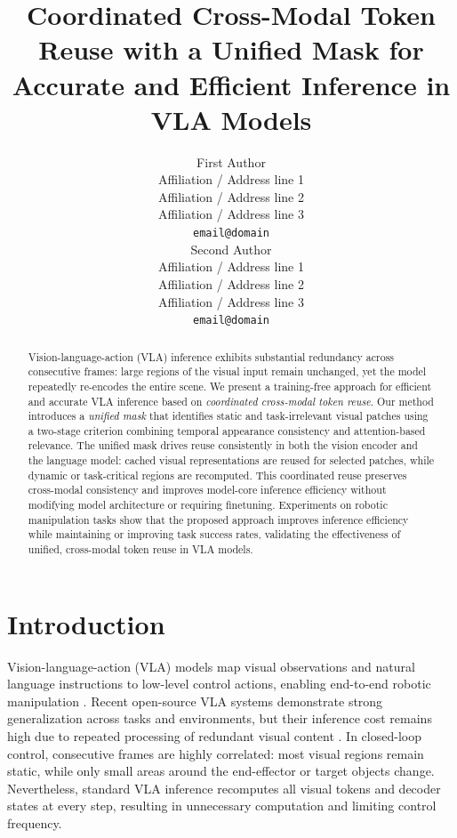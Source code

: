 \documentclass[11pt]{article}
\title{Coordinated Cross-Modal Token Reuse with a Unified Mask for Accurate and Efficient Inference in VLA Models}
\author{First Author \\
  Affiliation / Address line 1 \\
  Affiliation / Address line 2 \\
  Affiliation / Address line 3 \\
  \texttt{email@domain} \\ \And
  Second Author \\
  Affiliation / Address line 1 \\
  Affiliation / Address line 2 \\
  Affiliation / Address line 3 \\
  \texttt{email@domain} \\}
\begin{document}
\maketitle

\begin{abstract}
Vision-language-action (VLA) inference exhibits substantial redundancy across consecutive frames: large regions of the visual input remain unchanged, yet the model repeatedly re-encodes the entire scene. We present a training-free approach for efficient and accurate VLA inference based on \emph{coordinated cross-modal token reuse}. Our method introduces a \emph{unified mask} that identifies static and task-irrelevant visual patches using a two-stage criterion combining temporal appearance consistency and attention-based relevance. The unified mask drives reuse consistently in both the vision encoder and the language model: cached visual representations are reused for selected patches, while dynamic or task-critical regions are recomputed. This coordinated reuse preserves cross-modal consistency and improves model-core inference efficiency without modifying model architecture or requiring finetuning. Experiments on robotic manipulation tasks show that the proposed approach improves inference efficiency while maintaining or improving task success rates, validating the effectiveness of unified, cross-modal token reuse in VLA models.
\end{abstract}

\section{Introduction}
Vision-language-action (VLA) models map visual observations and natural language instructions to low-level control actions, enabling end-to-end robotic manipulation \citep{zitkovich2023rt,octo_2023,kim24openvla,black2024pi_0}. Recent open-source VLA systems demonstrate strong generalization across tasks and environments, but their inference cost remains high due to repeated processing of redundant visual content \citep{liu2024robomamba,wen2024tinyvla,DeeR-VLA}. In closed-loop control, consecutive frames are highly correlated: most visual regions remain static, while only small areas around the end-effector or target objects change. Nevertheless, standard VLA inference recomputes all visual tokens and decoder states at every step, resulting in unnecessary computation and limiting control frequency.
\end{document}
